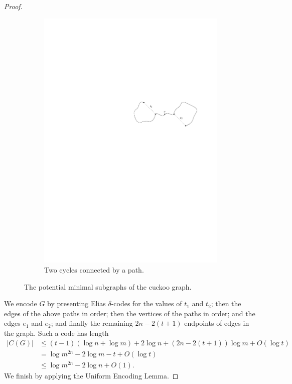 \documentclass{patmorin}
\begin{document}
\begin{proof}
\begin{figure}
\begin{subfigure}[b]{0.6\textwidth}
      \includegraphics{cuckoo2}
      \caption{Two cycles connected by a path.}
    \end{subfigure}
    \caption{The potential minimal subgraphs of the cuckoo graph.}
  \end{figure}

  We encode $G$ by presenting Elias $\delta$-codes for the values of
  $t_1$ and $t_2$; then the edges of the above paths in order; then
  the vertices of the paths in order; and the edges $e_1$ and $e_2$;
  and finally the remaining $2n - 2(t + 1)$ endpoints of edges in the
  graph. Such a code has length
  \begin{align*}
    |C(G)| &\leq (t - 1)(\log n + \log m) + 2\log n + (2n - 2(t + 1))\log m + O(\log t) \\
           &= \log m^{2n} - 2\log m - t + O(\log t) \\
           &\leq \log m^{2n} - 2\log n + O(1).
  \end{align*}
  We finish by applying the Uniform Encoding Lemma.
\end{proof}
\end{document}
